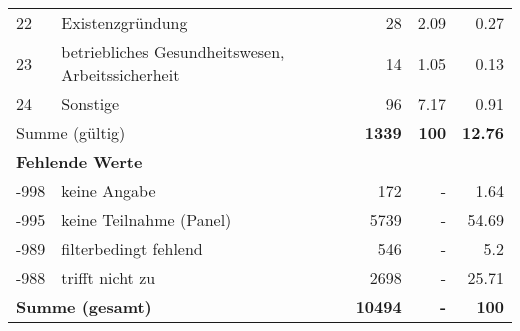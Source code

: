 \begin{longtable}{lXrrr}
        22 & \multicolumn{1}{X}{Existenzgründung} & %
          \num{28} &
          \num[round-mode=places,round-precision=2]{2.09} &
          \num[round-mode=places,round-precision=2]{0.27} \\

        23 & \multicolumn{1}{X}{betriebliches Gesundheitswesen, Arbeitssicherheit} & %
          \num{14} &
          \num[round-mode=places,round-precision=2]{1.05} &
          \num[round-mode=places,round-precision=2]{0.13} \\

        24 & \multicolumn{1}{X}{Sonstige} & %
          \num{96} &
          \num[round-mode=places,round-precision=2]{7.17} &
          \num[round-mode=places,round-precision=2]{0.91} \\

     \midrule
     \multicolumn{2}{l}{Summe (gültig)} &
       \textbf{\num{1339}} &
     \textbf{\num{100}} &
       \textbf{\num[round-mode=places,round-precision=2]{12.76}} \\
     \multicolumn{5}{l}{\textbf{Fehlende Werte}}\\
       -998 &
       keine Angabe &
         \num{172} &
        - &
         \num[round-mode=places,round-precision=2]{1.64} \\
       -995 &
       keine Teilnahme (Panel) &
         \num{5739} &
        - &
         \num[round-mode=places,round-precision=2]{54.69} \\
       -989 &
       filterbedingt fehlend &
         \num{546} &
        - &
         \num[round-mode=places,round-precision=2]{5.2} \\
       -988 &
       trifft nicht zu &
         \num{2698} &
        - &
         \num[round-mode=places,round-precision=2]{25.71} \\
     \midrule
     \multicolumn{2}{l}{\textbf{Summe (gesamt)}} &
          \textbf{\num{10494}} &
        \textbf{-} &
        \textbf{\num{100}} \\
     \bottomrule
     \end{longtable}
     
